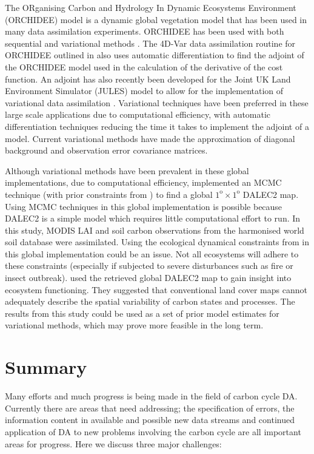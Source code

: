 The ORganising Carbon and Hydrology In Dynamic Ecosystems Environment (ORCHIDEE) model \citep{Krinner2005} is a dynamic global vegetation model that has been used in many data assimilation experiments. ORCHIDEE has been used with both sequential \citep{Demarty2007} and variational methods \citep{Bacour2015}. The 4D-Var data assimilation routine for ORCHIDEE outlined in \citet{Kuppel2012} also uses automatic differentiation to find the adjoint of the ORCHIDEE model used in the calculation of the derivative of the cost function. An adjoint has also recently been developed for the Joint UK Land Environment Simulator (JULES) model to allow for the implementation of variational data assimilation \citep{raoult2016land}. Variational techniques have been preferred in these large scale applications due to computational efficiency, with automatic differentiation techniques reducing the time it takes to implement the adjoint of a model. Current variational methods have made the approximation of diagonal background and observation error covariance matrices. %

Although variational methods have been prevalent in these global implementations, due to computational efficiency, \citet{bloom2016decadal} implemented an MCMC technique (with prior constraints from \citet{Bloom2015}) to find a global \(1^\text{o} \times 1^\text{o}\) DALEC2 map. Using MCMC techniques in this global implementation is possible because DALEC2 is a simple model which requires little computational effort to run. In this study, MODIS LAI and soil carbon observations from the harmonised world soil database were assimilated. Using the ecological dynamical constraints from \citet{Bloom2015} in this global implementation could be an issue. Not all ecosystems will adhere to these constraints (especially if subjected to severe disturbances such as fire or insect outbreak). \citet{bloom2016decadal} used the retrieved global DALEC2 map to gain insight into ecosystem functioning. They suggested that conventional land cover maps cannot adequately describe the spatial variability of carbon states and processes. The results from this study could be used as a set of prior model estimates for variational methods, which may prove more feasible in the long term. 

\section{Summary}

Many efforts and much progress is being made in the field of carbon cycle DA. Currently there are areas that need addressing; the specification of errors, the information content in available and possible new data streams and continued application of DA to new problems involving the carbon cycle are all important areas for progress. Here we discuss three major challenges:

